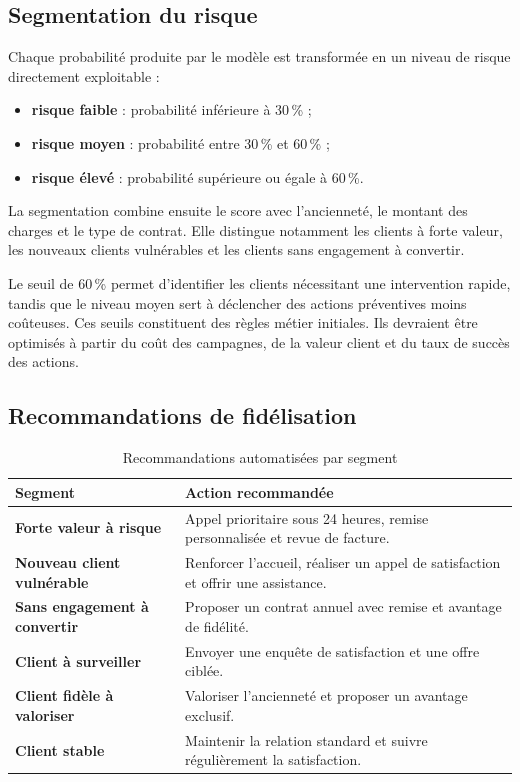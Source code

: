 \documentclass[12pt, a4paper]{article}
\begin{document}
\subsection{Segmentation du risque}

Chaque probabilité produite par le modèle est transformée en un niveau de
risque directement exploitable :
\begin{itemize}[leftmargin=*]
    \item \textcolor{successgreen}{\textbf{risque faible}} : probabilité
    inférieure à 30\,\% ;
    \item \textcolor{warningorange}{\textbf{risque moyen}} : probabilité entre
    30\,\% et 60\,\% ;
    \item \textcolor{riskred}{\textbf{risque élevé}} : probabilité supérieure
    ou égale à 60\,\%.
\end{itemize}

La segmentation combine ensuite le score avec l'ancienneté, le montant des
charges et le type de contrat. Elle distingue notamment les clients à forte
valeur, les nouveaux clients vulnérables et les clients sans engagement à
convertir.

Le seuil de 60\,\% permet d'identifier les clients nécessitant une intervention
rapide, tandis que le niveau moyen sert à déclencher des actions préventives
moins coûteuses. Ces seuils constituent des règles métier initiales. Ils
devraient être optimisés à partir du coût des campagnes, de la valeur client et
du taux de succès des actions.

\subsection{Recommandations de fidélisation}

\begin{table}[H]
\centering
\caption{Recommandations automatisées par segment}
\begin{tabularx}{\textwidth}{>{\bfseries}p{}X}
\toprule
\textbf{Segment} & \textbf{Action recommandée}\\
\midrule
Forte valeur à risque &
Appel prioritaire sous 24 heures, remise personnalisée et revue de facture.\\
Nouveau client vulnérable &
Renforcer l'accueil, réaliser un appel de satisfaction et offrir une
assistance.\\
Sans engagement à convertir &
Proposer un contrat annuel avec remise et avantage de fidélité.\\
Client à surveiller &
Envoyer une enquête de satisfaction et une offre ciblée.\\
Client fidèle à valoriser &
Valoriser l'ancienneté et proposer un avantage exclusif.\\
Client stable &
Maintenir la relation standard et suivre régulièrement la satisfaction.\\
\bottomrule
\end{tabularx}
\end{table}
\end{document}
